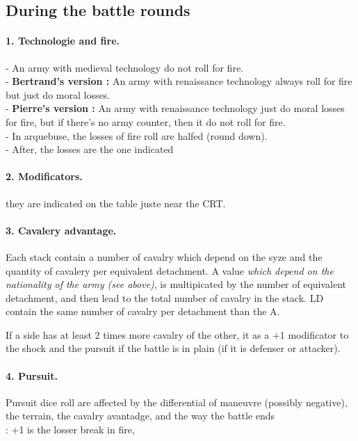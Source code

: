 \subsection{During the battle rounds}

\paragraph{1. Technologie and fire.}
- An army with medieval technology do not roll for fire.\\
- \textbf{Bertrand's version :} An army with renaissance technology always roll
for fire but just do moral losses.\\
- \textbf{Pierre's version :} An army with renaissance technology just do
moral losses for fire, but if there's no army counter, then it do not roll  
for fire. \\
- In arquebuse, the losses of fire roll are halfed (round down). \\
- After, the losses are the one indicated

\paragraph{2. Modificators.}
they are indicated on the table juste near the CRT.

\paragraph{3. Cavalery advantage.}
Each stack contain a number of cavalry which depend on the syze and the
quantity of cavalery per equivalent detachment. A value {\it which depend
on the nationality of the army (see above)}, is multipicated by the number
of equivalent detachment, and then lead to the total number of cavalry in
the stack. LD contain the same number of cavalry per detachment than the 
A.

If a side has at least 2 times more cavalry of the other, it as a
+1 modificator to the shock and the pursuit if the battle is in plain (if
it is defenser or attacker).

\cavalerie

\paragraph{4. Pursuit.}
Pursuit dice roll are affected by the differential of maneuvre (possibly
negative), the terrain, the cavalry avantadge, and the way the battle ends 
\\: +1 is the losser break in fire, \\

